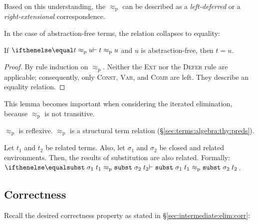 Based on this understanding, the $\approx_\text{p}$ can be described as a \emph{left-deferred} or a \emph{right-extensional} correspondence.

In the case of abstraction-free terms, the relation collapses to equality:

\begin{lemma}\label{thm:intermediate:elim:eq}
  If $\corrp t u$ and $u$ is abstraction-free, then $t = u$.
\end{lemma}

\begin{proof}
  By rule induction on $\approx_\text{p}$.
  Neither the \textsc{Ext} nor the \textsc{Defer} rule are applicable; consequently, only \textsc{Const}, \textsc{Var}, and \textsc{Comb} are left.
  They describe an equality relation.
\end{proof}

\noindent
This lemma becomes important when considering the iterated elimination, because $\approx_\text{p}$ is not transitive.

\begin{lemma}\label{thm:intermediate:elim:rel-struct}
  $\approx_\text{p}$ is reflexive. $\approx_\text{p}$ is a structural term relation (§\ref{sec:terms:algebra:thy:preds}).
\end{lemma}


\begin{lemma}[Substitution]\label{thm:intermediate:elim:subst}
  Let $t_1$ and $t_2$ be related terms.
  Also, let $\sigma_1$ and $\sigma_2$ be closed and related environments.
  Then, the results of substitution are also related.
  Formally: $\corrp{\holconst{subst}\;\sigma_1\;t_1}{\holconst{subst}\;\sigma_2\;t_2}$.
\end{lemma}

\subsection{Correctness}

Recall the desired correctness property as stated in §\ref{sec:intermediate:elim:corr}:

